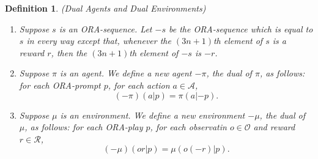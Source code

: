 \documentclass{article}
\newtheorem{definition}[theorem]{Definition}
\begin{document}
\begin{definition}
(Dual Agents and Dual Environments)
\begin{enumerate}
    \item
    Suppose $s$ is an ORA-sequence. Let $-s$
    be the ORA-sequence which is equal to $s$ in every way except that,
    whenever the $(3n+1)$th element of $s$ is a reward $r$,
    then the $(3n+1)$th element of $-s$ is $-r$.
    \item
    Suppose $\pi$ is an agent.
    We define a new agent $-\pi$, the \emph{dual} of $\pi$,
    as follows:
    for each ORA-prompt $p$, for each action $a\in\mathcal A$,
    \[(-\pi)(a|p)=\pi(a|{-p}).\]
    \item
    Suppose $\mu$ is an environment.
    We define a new environment $-\mu$, the \emph{dual} of $\mu$,
    as follows:
    for each ORA-play $p$, for each observatin $o\in\mathcal O$
    and reward $r\in\mathcal R$,
    \[(-\mu)(or|p)=\mu(o(-r)|p).\]
\end{enumerate}
\end{definition}





\end{document}

